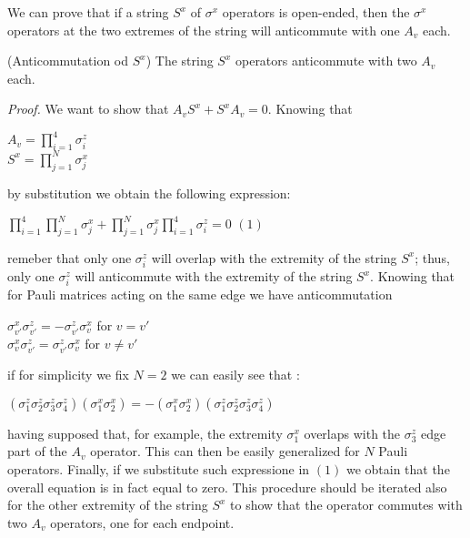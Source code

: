 \documentclass{Configuration_Files/PoliMi3i_thesis}
\begin{document}
\newpage
We can prove that if a string $S^x$ of $\sigma^x$ operators is open-ended, then the $\sigma^x$ operators at the two extremes of the string will anticommute with one $A_v$ each. 

\begin{proposition}(Anticommutation od $S^x$)
	The string $S^x$ operators anticommute with two $A_v$ each.
\end{proposition}

\textit{Proof.}\newline
We want to show that $A_v S^x + S^x A_v=0$. Knowing that 

\begin{center}
	$A_v = \prod_{i=1}^{4} \sigma_i^z$ \\ 
	$S^x = \prod_{j=1}^{N} \sigma_j^x$
\end{center}

by substitution we obtain the following expression: 

\begin{center}
	$\prod_{i=1}^{4} \prod_{j=1}^{N} \sigma_j^x + \prod_{j=1}^{N} \sigma_j^x \prod_{i=1}^{4} \sigma_i^z = 0$ $(1)$
\end{center}

remeber that only one $\sigma_i^z$ will overlap with the extremity of the string $S^x$; thus, only one $\sigma_i^z$ will anticommute with the extremity of the string $S^x$. Knowing that for Pauli matrices acting on the same edge we have anticommutation

\begin{center}
	$\sigma_{v'}^x \sigma_{v'}^z = - \sigma_{v'}^z \sigma_v^x$ for $v=v'$ \\
	$\sigma_v^x \sigma_{v'}^z =  \sigma_{v'}^z \sigma_v^x$ for $v \neq v'$ 
\end{center}

if for simplicity we fix $N=2$ we can easily see that :

\begin{center}
	$(\sigma_1^z \sigma_2^z \sigma_3^z \sigma_4^z)(\sigma_1^x \sigma_2^x)  = - (\sigma_1^x \sigma_2^x)(\sigma_1^z \sigma_2^z \sigma_3^z \sigma_4^z) $ 
\end{center}

having supposed that, for example, the extremity $\sigma_1^x$ overlaps with the $\sigma_3^z$ edge part of the $A_v$ operator. This can then be easily generalized for $N$ Pauli operators. Finally, if we substitute such expressione in $(1)$ we obtain that the overall equation is in fact equal to zero. \newline
This procedure should be iterated also for the other extremity of the string $S^x$ to show that the operator commutes with two $A_v$ operators, one for each endpoint.\newline
\end{document}
